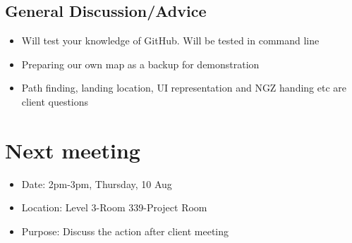 \documentclass[11pt, a4paper]{article}
\begin{document}
\subsection{General Discussion/Advice}
\begin{itemize}
\item Will test your knowledge of GitHub. Will be tested in command line
\item Preparing our own map as a backup for demonstration
\item Path finding, landing location, UI representation and NGZ handing etc are client questions

\end{itemize}





\section{Next meeting}
\begin{itemize}
\item Date: 2pm-3pm, Thursday, 10 Aug
\item Location: Level 3-Room 339-Project Room
\item Purpose: Discuss the action after client meeting
\end{itemize}

\vspace*{10pt}
\end{document}
